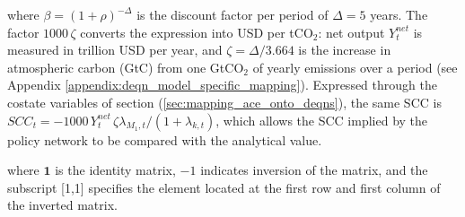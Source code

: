 where \(\beta = (1+\rho)^{-\Delta}\) is the discount factor per period of \(\Delta = 5\) years. The factor \(1000\,\zeta\) converts the expression into USD per tCO\(_2\): net output \(Y_t^{net}\) is measured in trillion USD per year, and \(\zeta = \Delta/3.664\) is the increase in atmospheric carbon (GtC) from one GtCO\(_2\) of yearly emissions over a period (see Appendix \ref{appendix:deqn_model_specific_mapping}). Expressed through the costate variables of section (\ref{sec:mapping_ace_onto_deqns}), the same SCC is \(SCC_t = -1000\, Y_t^{net}\, \zeta \lambda_{M_1,t} / (1 + \lambda_{k,t})\), which allows the SCC implied by the policy network to be compared with the analytical value.

where \(\bm{1}\) is the identity matrix, \(-1\) indicates inversion of the matrix, and the subscript [1,1] specifies the element located at the first row and first column of the inverted matrix.